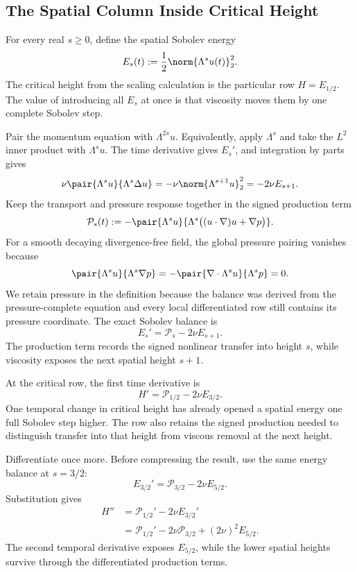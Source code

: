 
\subsection{The Spatial Column Inside Critical Height}\label{sub:TheSpatialColumnInsideCriticalHeight}

For every real \(s\geq0\), define the spatial Sobolev energy
\[
  E_s(t)
  :=
  \frac12\norm{\Lambda^su(t)}_2^2.
\]
The critical height from the scaling calculation is the particular row \(H=E_{1/2}\).
The value of introducing all \(E_s\) at once is that viscosity moves them by one complete Sobolev step.

Pair the momentum equation with \(\Lambda^{2s}u\).
Equivalently, apply \(\Lambda^s\) and take the \(L^2\) inner product with \(\Lambda^su\).
The time derivative gives \(E_s'\), and integration by parts gives
\[
  \nu\pair{\Lambda^su}{\Lambda^s\Delta u}
  =
  -\nu\norm{\Lambda^{s+1}u}_2^2
  =
  -2\nu E_{s+1}.
\]
Keep the transport and pressure response together in the signed production term
\[
  \mathcal P_s(t)
  :=
  -\pair{\Lambda^su}
  {\Lambda^s\bigl((u\cdot\nabla)u+\nabla p\bigr)}.
\]
For a smooth decaying divergence-free field, the global pressure pairing vanishes because
\[
  \pair{\Lambda^su}{\Lambda^s\nabla p}
  =
  -\pair{\nabla\cdot\Lambda^su}{\Lambda^sp}
  =0.
\]
We retain pressure in the definition because the balance was derived from the pressure-complete equation and every local differentiated row still contains its pressure coordinate.
The exact Sobolev balance is
\[
  E_s'
  =
  \mathcal P_s-2\nu E_{s+1}.
\]
The production term records the signed nonlinear transfer into height \(s\), while viscosity exposes the next spatial height \(s+1\).

At the critical row, the first time derivative is
\[
  H'
  =
  \mathcal P_{1/2}-2\nu E_{3/2}.
\]
One temporal change in critical height has already opened a spatial energy one full Sobolev step higher.
The row also retains the signed production needed to distinguish transfer into that height from viscous removal at the next height.

Differentiate once more.
Before compressing the result, use the same energy balance at \(s=3/2\):
\[
  E_{3/2}'
  =
  \mathcal P_{3/2}-2\nu E_{5/2}.
\]
Substitution gives
\begin{align*}
  H''
  &={}
  \mathcal P_{1/2}'-2\nu E_{3/2}'
  \\
  &={}
  \mathcal P_{1/2}'
  -2\nu\mathcal P_{3/2}
  +(2\nu)^2E_{5/2}.
\end{align*}
The second temporal derivative exposes \(E_{5/2}\), while the lower spatial heights survive through the differentiated production terms.

